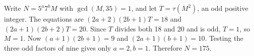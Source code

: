 Write $N=5^a7^bM$ with $\gcd(M,35)=1$, and let $T=\tau(M^2)$, an odd positive integer. The equations are $(2a+2)(2b+1)T=18$ and $(2a+1)(2b+2)T=20$. Since $T$ divides both 18 and 20 and is odd, $T=1$, so $M=1$. Now $(a+1)(2b+1)=9$ and $(2a+1)(b+1)=10$. Testing the three odd factors of nine gives only $a=2,b=1$. Therefore $\boxed{N=175}$.

